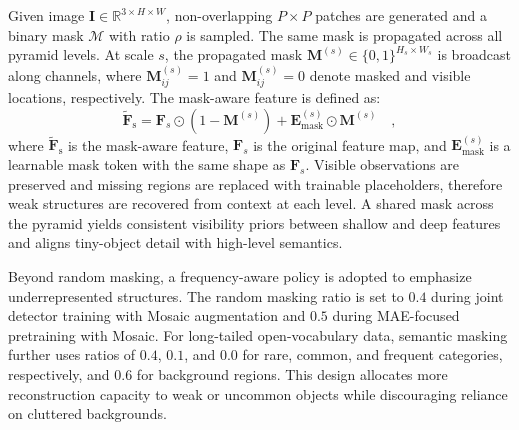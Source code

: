 \documentclass[letterpaper, 10 pt, conference]{ieeeconf}  %
\begin{document}
Given image $\mathbf{I} \in \mathbb{R}^{3 \times H \times W}$, non-overlapping $P \times P$ patches are generated and a binary mask $\mathcal{M}$ with ratio $\rho$ is sampled. The same mask is propagated across all pyramid levels. At scale $s$, the propagated mask $\mathbf{M}^{(s)} \in \{0,1\}^{H_s \times W_s}$ is broadcast along channels, where $\mathbf{M}^{(s)}_{ij}=1$ and $\mathbf{M}^{(s)}_{ij}=0$ denote masked and visible locations, respectively. The mask-aware feature is defined as:
\begin{equation}
\mathbf{\tilde{F}}_{\mathrm{s}} = \mathbf{F}_s \odot (1 - \mathbf{M}^{(s)}) + \mathbf{E}^{(s)}_{\mathrm{mask}} \odot \mathbf{M}^{(s)} \quad,
\end{equation}
where $\mathbf{\tilde{F}}_{\mathrm{s}}$ is the mask-aware feature, $\mathbf{F}_s$ is the original feature map, and $\mathbf{E}^{(s)}_{\mathrm{mask}}$ is a learnable mask token with the same shape as $\mathbf{F}_s$. Visible observations are preserved and missing regions are replaced with trainable placeholders, therefore weak structures are recovered from context at each level. A shared mask across the pyramid yields consistent visibility priors between shallow and deep features and aligns tiny-object detail with high-level semantics.


Beyond random masking, a frequency-aware policy is adopted to emphasize underrepresented structures. The random masking ratio is set to $0.4$ during joint detector training with Mosaic augmentation and $0.5$ during MAE-focused pretraining with Mosaic. For long-tailed open-vocabulary data, semantic masking further uses ratios of $0.4$, $0.1$, and $0.0$ for rare, common, and frequent categories, respectively, and $0.6$ for background regions. This design allocates more reconstruction capacity to weak or uncommon objects while discouraging reliance on cluttered backgrounds.
\end{document}
